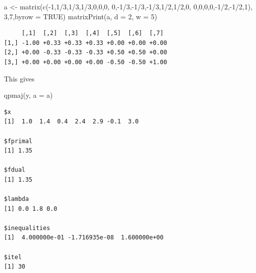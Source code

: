 \documentclass[
  12pt,
  letterpaper,
  DIV=11,
  numbers=noendperiod]{scrreprt}
\newenvironment{Shaded}{\begin{snugshade}}{\end{snugshade}}
\newcommand{\AttributeTok}[1]{\textcolor[rgb]{0.40,0.45,0.13}{#1}}
\newcommand{\ConstantTok}[1]{\textcolor[rgb]{0.56,0.35,0.01}{#1}}
\newcommand{\DecValTok}[1]{\textcolor[rgb]{0.68,0.00,0.00}{#1}}
\newcommand{\FunctionTok}[1]{\textcolor[rgb]{0.28,0.35,0.67}{#1}}
\newcommand{\NormalTok}[1]{\textcolor[rgb]{0.00,0.23,0.31}{#1}}
\newcommand{\OtherTok}[1]{\textcolor[rgb]{0.00,0.23,0.31}{#1}}
\newcommand{\SpecialCharTok}[1]{\textcolor[rgb]{0.37,0.37,0.37}{#1}}
\theoremstyle{remark}
\begin{document}
\begin{Shaded}
\begin{Highlighting}[]
\NormalTok{a }\OtherTok{\textless{}{-}} \FunctionTok{matrix}\NormalTok{(}\FunctionTok{c}\NormalTok{(}\SpecialCharTok{{-}}\DecValTok{1}\NormalTok{,}\DecValTok{1}\SpecialCharTok{/}\DecValTok{3}\NormalTok{,}\DecValTok{1}\SpecialCharTok{/}\DecValTok{3}\NormalTok{,}\DecValTok{1}\SpecialCharTok{/}\DecValTok{3}\NormalTok{,}\DecValTok{0}\NormalTok{,}\DecValTok{0}\NormalTok{,}\DecValTok{0}\NormalTok{,}
              \DecValTok{0}\NormalTok{,}\SpecialCharTok{{-}}\DecValTok{1}\SpecialCharTok{/}\DecValTok{3}\NormalTok{,}\SpecialCharTok{{-}}\DecValTok{1}\SpecialCharTok{/}\DecValTok{3}\NormalTok{,}\SpecialCharTok{{-}}\DecValTok{1}\SpecialCharTok{/}\DecValTok{3}\NormalTok{,}\DecValTok{1}\SpecialCharTok{/}\DecValTok{2}\NormalTok{,}\DecValTok{1}\SpecialCharTok{/}\DecValTok{2}\NormalTok{,}\DecValTok{0}\NormalTok{,}
              \DecValTok{0}\NormalTok{,}\DecValTok{0}\NormalTok{,}\DecValTok{0}\NormalTok{,}\DecValTok{0}\NormalTok{,}\SpecialCharTok{{-}}\DecValTok{1}\SpecialCharTok{/}\DecValTok{2}\NormalTok{,}\SpecialCharTok{{-}}\DecValTok{1}\SpecialCharTok{/}\DecValTok{2}\NormalTok{,}\DecValTok{1}\NormalTok{),}
              \DecValTok{3}\NormalTok{,}\DecValTok{7}\NormalTok{,}\AttributeTok{byrow =} \ConstantTok{TRUE}\NormalTok{)}
\FunctionTok{matrixPrint}\NormalTok{(a, }\AttributeTok{d =} \DecValTok{2}\NormalTok{, }\AttributeTok{w =} \DecValTok{5}\NormalTok{)}
\end{Highlighting}
\end{Shaded}

\begin{verbatim}
     [,1]  [,2]  [,3]  [,4]  [,5]  [,6]  [,7] 
[1,] -1.00 +0.33 +0.33 +0.33 +0.00 +0.00 +0.00
[2,] +0.00 -0.33 -0.33 -0.33 +0.50 +0.50 +0.00
[3,] +0.00 +0.00 +0.00 +0.00 -0.50 -0.50 +1.00
\end{verbatim}

This gives

\begin{Shaded}
\begin{Highlighting}[]
\FunctionTok{qpmaj}\NormalTok{(y, }\AttributeTok{a =}\NormalTok{ a)}
\end{Highlighting}
\end{Shaded}

\begin{verbatim}
$x
[1]  1.0  1.4  0.4  2.4  2.9 -0.1  3.0

$fprimal
[1] 1.35

$fdual
[1] 1.35

$lambda
[1] 0.0 1.8 0.0

$inequalities
[1]  4.000000e-01 -1.716935e-08  1.600000e+00

$itel
[1] 30
\end{verbatim}
\end{document}
